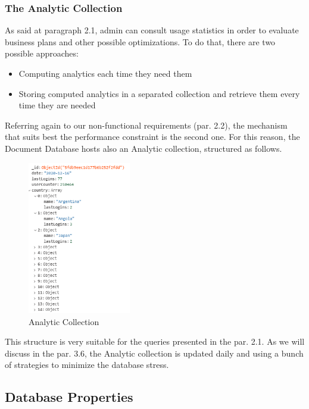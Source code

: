 \subsubsection{The Analytic Collection}
As said at paragraph 2.1, admin can consult usage statistics in order to evaluate business plans and other possible optimizations. 
To do that, there are two possible approaches:
\begin{itemize}
	\item Computing analytics each time they need them
	\item Storing computed analytics in a separated collection and retrieve them every time they are needed
\end{itemize}

Referring again to our non-functional requirements (par. 2.2), the mechanism that suits best the performance constraint is the second one. 
For this reason, the Document Database hosts also an Analytic collection, structured as follows.
\begin{figure}[H]
	\centering
	\includegraphics[width= 0.4\textwidth]{img/analytic_collection.png}
	\caption{Analytic Collection}
\end{figure}

This structure is very suitable for the queries presented in the par. 2.1. 
As we will discuss in the par. 3.6, the Analytic collection is updated daily and using a bunch of strategies to minimize the database stress.


\subsection{Database Properties}
